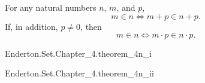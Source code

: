 \documentclass{report}
\begin{document}
\subsection{}%

  \begin{theorem}[4N]
    For any natural numbers $n$, $m$, and $p$,
      \begin{equation}
        m \in n \iff m + p \in n + p. \tag{i}
      \end{equation}
    If, in addition, $p \neq 0$, then
      \begin{equation}
        m \in n \iff m \cdot p \in n \cdot p. \tag{ii}
      \end{equation}
  \end{theorem}

    {Enderton.Set.Chapter\_4.theorem\_4n\_i}


    {Enderton.Set.Chapter\_4.theorem\_4n\_ii}

\end{document}
